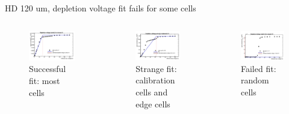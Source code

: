 \documentclass{beamer}
\begin{document}
\begin{frame}{HD 120 um, depletion voltage fit fails for some cells}
  \begin{columns}
    \begin{figure}
      \includegraphics[width=.55\textwidth]{plots/CV_Fit_just_figures1.png}
      \caption{Successful fit: most cells}
    \end{figure}

    \begin{figure}
      \includegraphics[width=.55\textwidth]{plots/CV_Fit_just_figures2.png}
      \caption{Strange fit: calibration cells and edge cells}
    \end{figure}
    \begin{figure}
      \includegraphics[width=.55\textwidth]{plots/CV_Fit_just_figures3.png}
      \caption{Failed fit: random cells}
    \end{figure}

\end{columns}

  \begin{figure}
    
  \end{figure}
  \href{https://indico.cern.ch/event/1119831/contributions/4702464/attachments/2378225/4063679/Si\%20sensor\%20meeting.pdf}{}

\end{frame}
\end{document}
